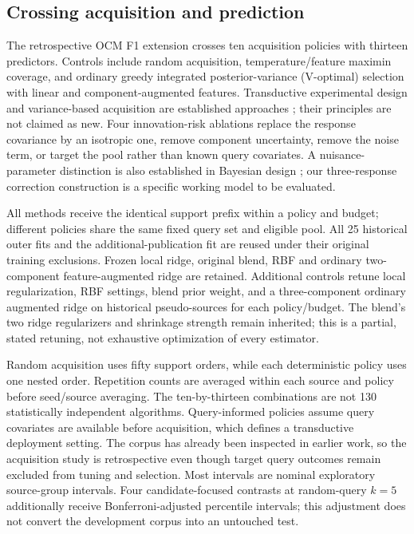 \documentclass[11pt]{article}
\begin{document}
\subsection{Crossing acquisition and prediction}
The retrospective OCM F1 extension crosses ten acquisition policies with thirteen predictors. Controls include random acquisition, temperature/feature maximin coverage, and ordinary greedy integrated posterior-variance (V-optimal) selection with linear and component-augmented features. Transductive experimental design and variance-based acquisition are established approaches \cite{yubi,fontaine}; their principles are not claimed as new. Four innovation-risk ablations replace the response covariance by an isotropic one, remove component uncertainty, remove the noise term, or target the pool rather than known query covariates. A nuisance-parameter distinction is also established in Bayesian design \cite{sloman}; our three-response correction construction is a specific working model to be evaluated.

All methods receive the identical support prefix within a policy and budget; different policies share the same fixed query set and eligible pool. All 25 historical outer fits and the additional-publication fit are reused under their original training exclusions. Frozen local ridge, original blend, RBF and ordinary two-component feature-augmented ridge are retained. Additional controls retune local regularization, RBF settings, blend prior weight, and a three-component ordinary augmented ridge on historical pseudo-sources for each policy/budget. The blend's two ridge regularizers and shrinkage strength remain inherited; this is a partial, stated retuning, not exhaustive optimization of every estimator.

Random acquisition uses fifty support orders, while each deterministic policy uses one nested order. Repetition counts are averaged within each source and policy before seed/source averaging. The ten-by-thirteen combinations are not 130 statistically independent algorithms. Query-informed policies assume query covariates are available before acquisition, which defines a transductive deployment setting. The corpus has already been inspected in earlier work, so the acquisition study is retrospective even though target query outcomes remain excluded from tuning and selection. Most intervals are nominal exploratory source-group intervals. Four candidate-focused contrasts at random-query $k=5$ additionally receive Bonferroni-adjusted percentile intervals; this adjustment does not convert the development corpus into an untouched test.
\end{document}
